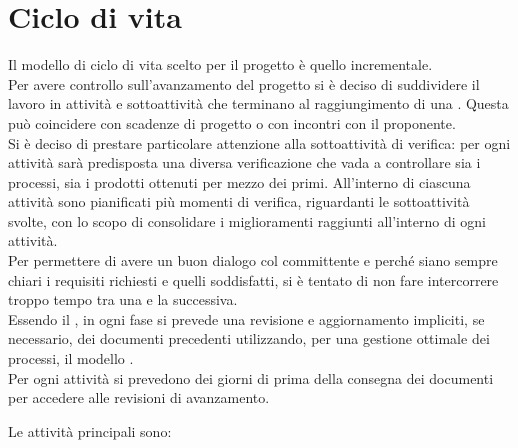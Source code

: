 \documentclass[a4paper, titlepage]{article}
\begin{document}
	\section{Ciclo di vita}\label{Ciclo di vita}
	Il modello di ciclo di vita scelto per il progetto è quello incrementale.\\
	Per avere controllo sull'avanzamento del progetto si è deciso di suddividere il lavoro in attività e sottoattività che terminano al raggiungimento di una . Questa  può coincidere con scadenze di progetto o con incontri con il proponente.\\
	Si è deciso di prestare particolare attenzione alla sottoattività di verifica: per ogni attività sarà predisposta una diversa verificazione che vada a controllare sia i processi, sia i prodotti ottenuti per mezzo dei primi. All’interno di ciascuna attività sono pianificati più momenti di verifica, riguardanti le sottoattività svolte, con lo scopo di consolidare i miglioramenti raggiunti all'interno di ogni attività.\\
	Per permettere di avere un buon dialogo col committente e perché siano sempre chiari i requisiti richiesti e quelli soddisfatti, si è tentato di non fare intercorrere troppo tempo tra una  e la successiva.\\
	Essendo il , in ogni fase si prevede una revisione e aggiornamento impliciti, se necessario, dei documenti precedenti utilizzando, per una gestione ottimale dei processi, il modello .\\
	Per ogni attività si prevedono dei giorni di  prima della consegna dei documenti per accedere alle revisioni di avanzamento.
	
	Le attività principali sono:
	
\end{document}

